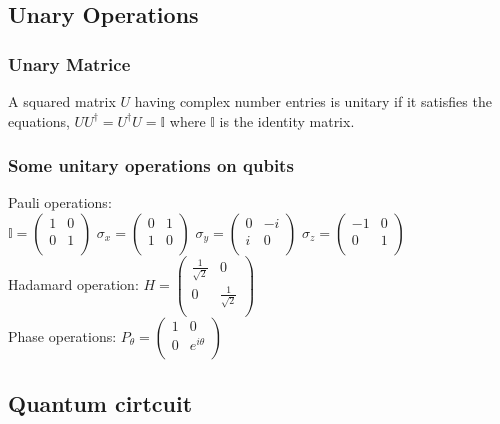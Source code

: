 \documentclass[5pt]{article}
\begin{document}
\begin{multicols}{3}
\subsection{Unary Operations}
\subsubsection{Unary Matrice}
A squared matrix $U$ having complex number entries is unitary if it satisfies the equations, 
$UU^\dagger=U^\dagger U=\mathbb{I}$ where $\mathbb{I}$ is the identity matrix.

\subsubsection{Some unitary operations on qubits}
Pauli operations:\\
$\mathbb{I}=\begin{pmatrix}
     1 & 0 \\
     0 & 1 \\
\end{pmatrix}$ 
$\sigma_x =\begin{pmatrix}
     0 & 1 \\
     1 & 0 \\
\end{pmatrix}$
$\sigma_y =\begin{pmatrix}
     0 & -i \\
     i & 0 \\
\end{pmatrix}$
$\sigma_z =\begin{pmatrix}
    -1 & 0 \\
     0 & 1 \\
\end{pmatrix}$ \\
Hadamard operation: 
$H =\begin{pmatrix}
     \frac{1}{\sqrt{2}} & 0 \\
     0 & \frac{1}{\sqrt{2}} \\
\end{pmatrix}$ \\
Phase operations:
$P_\theta =\begin{pmatrix}
     1 & 0 \\
     0 & e^{i\theta} \\
\end{pmatrix}$ \\



\subsection{Quantum cirtcuit}

\end{multicols}
\end{document}
